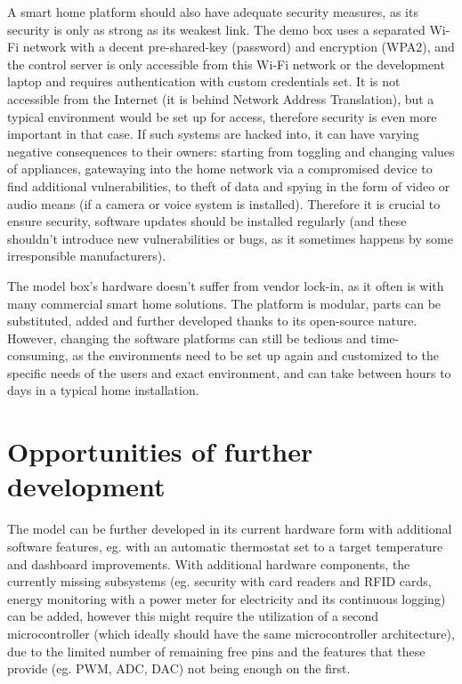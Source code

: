 A smart home platform should also have adequate security measures, as its security is only as strong as its weakest link. The demo box uses a separated Wi-Fi network with a decent pre-shared-key (password) and encryption (WPA2), and the control server is only accessible from this Wi-Fi network or the development laptop and requires authentication with custom credentials set. It is not accessible from the Internet (it is behind Network Address Translation), but a typical environment would be set up for access, therefore security is even more important in that case. If such systems are hacked into, it can have varying negative consequences to their owners: starting from toggling and changing values of appliances, gatewaying into the home network via a compromised device to find additional vulnerabilities, to theft of data and spying in the form of video or audio means (if a camera or voice system is installed). Therefore it is crucial to ensure security, software updates should be installed regularly (and these shouldn't introduce new vulnerabilities or bugs, as it sometimes happens by some irresponsible manufacturers).

The model box's hardware doesn't suffer from vendor lock-in, as it often is with many commercial smart home solutions. The platform is modular, parts can be substituted, added and further developed thanks to its open-source nature. However, changing the software platforms can still be tedious and time-consuming, as the environments need to be set up again and customized to the specific needs of the users and exact environment, and can take between hours to days in a typical home installation.

\section{Opportunities of further development}

The model can be further developed in its current hardware form with additional software features, eg. with an automatic thermostat set to a target temperature and dashboard improvements. With additional hardware components, the currently missing subsystems (eg. security with card readers and RFID cards, energy monitoring with a power meter for electricity and its continuous logging) can be added, however this might require the utilization of a second microcontroller (which ideally should have the same microcontroller architecture), due to the limited number of remaining free pins and the features that these provide (eg. PWM, ADC, DAC) not being enough on the first.

